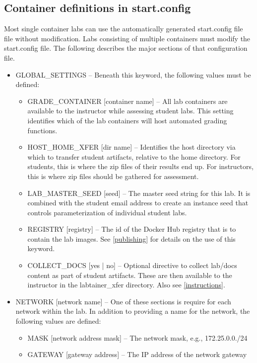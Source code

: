 \documentclass[12pt]{article}
\begin{document}
\subsection{Container definitions in start.config}
\label{start.config}
Most single container labs can use the automatically generated start.config file file
without modification.  Labs consisting of multiple containers must modify the start.config 
file.  The following describes the major sections of that configuration file.
\begin{itemize}
\item GLOBAL\_SETTINGS -- Beneath this keyword, the following values must be defined:

\begin{itemize}
\item GRADE\_CONTAINER [container name] -- All lab containers are available to the instructor while assessing student labs.
This setting identifies which of the lab containers will host automated grading functions.
\item HOST\_HOME\_XFER [dir name] --  Identifies the host directory via which to transfer student artifacts, relative to 
the home directory.  For students, this is where the zip files of their results end up.  For instructors, this is
where zip files should be gathered for assessment.
\item LAB\_MASTER\_SEED [seed] -- The master seed string for this lab.  It is combined with the student email
address to create an instance seed that controls parameterization of individual student labs.
\item REGISTRY [registry] -- The id of the Docker Hub registry that is to contain the lab images.
See \ref{publishing} for details on the use of this keyword.
\item COLLECT\_DOCS [yes | no] -- Optional directive to collect lab/docs content as part of student artifacts.
These are then available to the instructor in the labtainer\_xfer directory.  Also see \ref{instructions}.
\end{itemize}

\item NETWORK [network name] -- One of these sections is require for each network within the lab.  In addition to
providing a name for the network, the following values are defined:

\begin{itemize}
\item MASK [network address mask] -- The network mask, e.g., 172.25.0.0./24
\item GATEWAY [gateway address] -- The IP address of the network gateway
\end{itemize}


\end{itemize}
\end{document}
